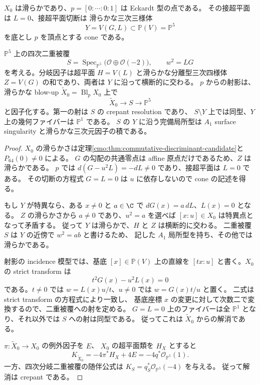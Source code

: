 \begin{proposition}[零係数の具体的射影模型]
\label{cmo:prop:zero-eckardt-resolution}
$X_0$ は滑らかであり、$p=[0:\cdots:0:1]$ は Eckardt 型の点である。
その接超平面は $L=0$、接超平面切断は
滑らかな三次三様体
\[
 Y=V(G,L)\subset\mathbb P(V)=\mathbb P^5
\]
を底とし $p$ を頂点とする cone である。

$\mathbb P^5$ 上の四次二重被覆
\[
 S=\operatorname{Spec}_{\mathbb P^5}
      \bigl(\mathcal O\oplus\mathcal O(-2)\bigr),
 \qquad w^2=LG
\]
を考える。分岐因子は超平面 $H=V(L)$ と滑らかな分離型三次四様体
$Z=V(G)$ の和であり、両者は $Y$ に沿って横断的に交わる。
$p$ からの射影は、滑らかな blow-up $\widetilde X_0=\operatorname{Bl}_pX_0$ 上で
\[
 \widetilde X_0\longrightarrow S\longrightarrow\mathbb P^5
\]
と因子化する。第一の射は $S$ の crepant resolution であり、
$S\setminus Y$ 上では同型、$Y$ 上の幾何ファイバーは $\mathbb P^1$ である。
$S$ の $Y$ に沿う完備局所型は $A_1$ surface singularity と滑らかな三次元因子の積である。
\end{proposition}
\begin{proof}
$X_0$ の滑らかさは定理\ref{cmo:thm:commutative-discriminant-candidate}と $P_{64}(0)\ne0$ による。
$G$ の勾配の共通零点は affine 原点だけであるため、$Z$ は滑らかである。
$p$ では $d(G-u^2L)=-dL\ne0$ であり、接超平面は $L=0$ である。
その切断の方程式 $G=L=0$ は $u$ に依存しないので cone の記述を得る。

もし $Y$ が特異なら、ある $x\ne0$ と $a\in\C$ で
$dG(x)=a\,dL$、$L(x)=0$ となる。
$Z$ の滑らかさから $a\ne0$ であり、$u^2=a$ を選べば
$[x:u]\in X_0$ は特異点となって矛盾する。
従って $Y$ は滑らかで、$H$ と $Z$ は横断的に交わる。
二重被覆 $S$ は $Y$ の近傍で $w^2=ab$ と書けるため、
記した $A_1$ 局所型を持ち、その他では滑らかである。

射影の incidence 模型では、基底 $[x]\in\mathbb P(V)$ 上の直線を
$[tx:u]$ と書く。$X_0$ の strict transform は
\[
 t^2G(x)-u^2L(x)=0
\]
である。$t\ne0$ では $w=L(x)u/t$、$u\ne0$ では $w=G(x)t/u$ と置く。
二式は strict transform の方程式により一致し、
基底座標 $x$ の変更に対して次数二で変換するので、二重被覆への射を定める。
$G=L=0$ 上のファイバーは全 $\mathbb P^1$ となり、それ以外では $S$ への射は同型である。
従ってこれは $\widetilde X_0$ からの解消である。

$\pi:\widetilde X_0\to X_0$ の例外因子を $E$、
$X_0$ の超平面類を $H_X$ とすると
\[
 K_{\widetilde X_0}=-4\pi^*H_X+4E
   =-4q^*\mathcal O_{\mathbb P^5}(1).
\]
一方、四次分岐二重被覆の随伴公式は
$K_S=q_S^*\mathcal O_{\mathbb P^5}(-4)$ を与える。
従って解消は crepant である。
\end{proof}


